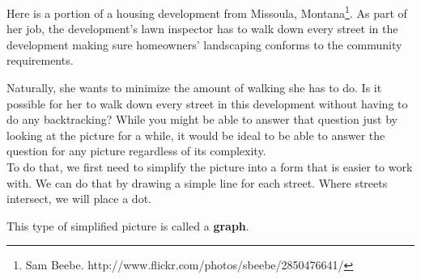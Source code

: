 \begin{example}{}
Here is a portion of a housing development from Missoula, Montana\footnote{Sam Beebe. http://www.flickr.com/photos/sbeebe/2850476641/}.  As part of her job, the development's lawn inspector has to walk down every street in the development making sure homeowners' landscaping conforms to the community requirements.\\
\begin{center}
\par{}\label{fig:GraphPicture}%

\end{center}

Naturally, she wants to minimize the amount of walking she has to do.  Is it possible for her to walk down every street in this development without having to do any backtracking?  While you might be able to answer that question just by looking at the picture for a while, it would be ideal to be able to answer the question for any picture regardless of its complexity.\\

To do that, we first need to simplify the picture into a form that is easier to work with.  We can do that by drawing a simple line for each street.  Where streets intersect, we will place a dot. \\
 
 \par{}\label{fig:GraphPictureDot}%

\end{example}

This type of simplified picture is called a \textbf{graph}.  

